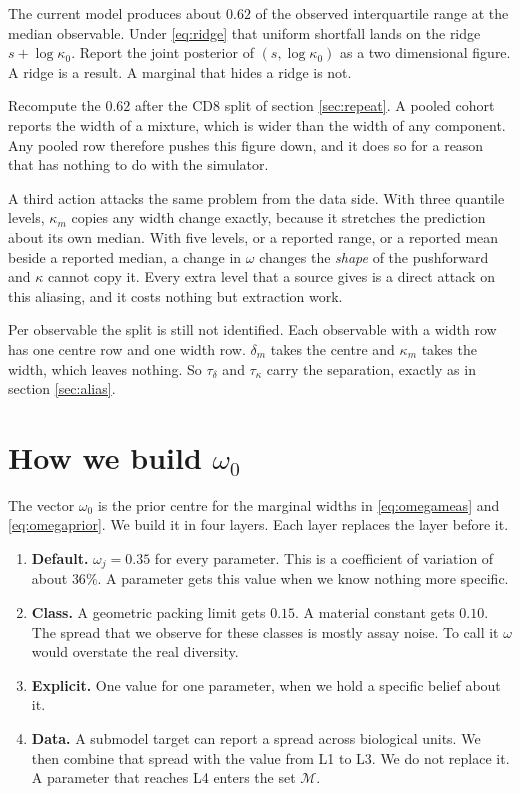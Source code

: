 \documentclass[11pt]{article}
\newcommand{\Mset}{\mathcal{M}}
\begin{document}
The current model produces about $0.62$ of the observed interquartile range at
the median observable. Under \eqref{eq:ridge} that uniform shortfall lands on the
ridge $s+\log\kappa_0$. Report the joint posterior of $(s,\log\kappa_0)$ as a two
dimensional figure. A ridge is a result. A marginal that hides a ridge is not.

Recompute the $0.62$ after the CD8 split of section \ref{sec:repeat}. A pooled
cohort reports the width of a mixture, which is wider than the width of any
component. Any pooled row therefore pushes this figure down, and it does so for
a reason that has nothing to do with the simulator.

A third action attacks the same problem from the data side. With three quantile
levels, $\kappa_m$ copies any width change exactly, because it stretches the
prediction about its own median. With five levels, or a reported range, or a
reported mean beside a reported median, a change in $\omega$ changes the
\emph{shape} of the pushforward and $\kappa$ cannot copy it. Every extra level
that a source gives is a direct attack on this aliasing, and it costs nothing but
extraction work.

Per observable the split is still not identified. Each observable with a width
row has one centre row and one width row. $\delta_m$ takes the centre and
$\kappa_m$ takes the width, which leaves nothing. So $\tau_\delta$ and
$\tau_\kappa$ carry the separation, exactly as in section \ref{sec:alias}.

\section{How we build \texorpdfstring{$\omega_0$}{omega0}}
\label{sec:omega}

The vector $\omega_0$ is the prior centre for the marginal widths in
\eqref{eq:omegameas} and \eqref{eq:omegaprior}. We build it in four layers. Each
layer replaces the layer before it.

\begin{enumerate}[label=\textbf{L\arabic*.}]
\item \textbf{Default.} $\omega_j=0.35$ for every parameter. This is a
      coefficient of variation of about $36\%$. A parameter gets this value when
      we know nothing more specific.
\item \textbf{Class.} A geometric packing limit gets $0.15$. A material constant
      gets $0.10$. The spread that we observe for these classes is mostly assay
      noise. To call it $\omega$ would overstate the real diversity.
\item \textbf{Explicit.} One value for one parameter, when we hold a specific
      belief about it.
\item \textbf{Data.} A submodel target can report a spread across biological
      units. We then combine that spread with the value from L1 to L3. We do not
      replace it. A parameter that reaches L4 enters the set $\Mset$.
\end{enumerate}
\end{document}
